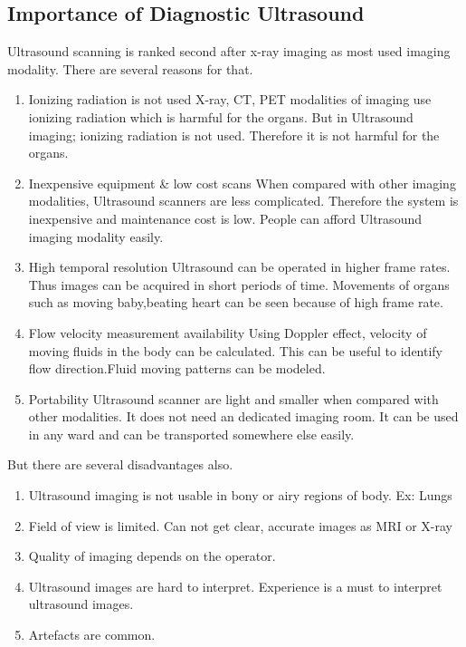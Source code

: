 \documentclass[12pt]{article}
\def \topic{Diagnostic Ultrasound}
\begin{document}
\subsection{Importance of \topic}
Ultrasound scanning is ranked second after x-ray imaging as most used imaging modality. There are several reasons for that.   
\begin{enumerate}
    \item Ionizing radiation is not used\newline
    X-ray, CT, PET modalities of imaging use ionizing radiation which is harmful for the organs. But in Ultrasound imaging; ionizing radiation is not used. Therefore it is not harmful for the organs. 
    \item Inexpensive equipment \& low cost scans \newline
    When compared with other imaging modalities, Ultrasound scanners are less complicated. Therefore the system is inexpensive and maintenance cost is low. People can afford Ultrasound imaging modality easily.  
    
    \item High temporal resolution\newline
    Ultrasound can be operated in higher frame rates. Thus images can be acquired in short periods of time. Movements of organs such as moving baby,beating heart can be seen because of high frame rate. 
  
    \item Flow velocity measurement availability\newline
    Using Doppler effect, velocity of moving fluids in the body can be calculated. This can be useful to identify flow direction.Fluid moving patterns can be modeled.  
    
    \item Portability\newline
    Ultrasound scanner are light and smaller when compared with other modalities. It does not need an dedicated imaging room. It can be used in any ward and can be transported somewhere else easily. 
    
\end{enumerate}
But there are several disadvantages also. 
\begin{enumerate}
    \item Ultrasound imaging is not usable in bony or airy regions of body. Ex: Lungs  
    \item Field of view is limited. Can not get clear, accurate images as MRI or X-ray
    \item Quality of imaging depends on the operator.  
    \item Ultrasound images are hard to interpret. Experience is a must to interpret ultrasound images.
    \item Artefacts are common.
\end{enumerate}
\pagebreak
\end{document}
